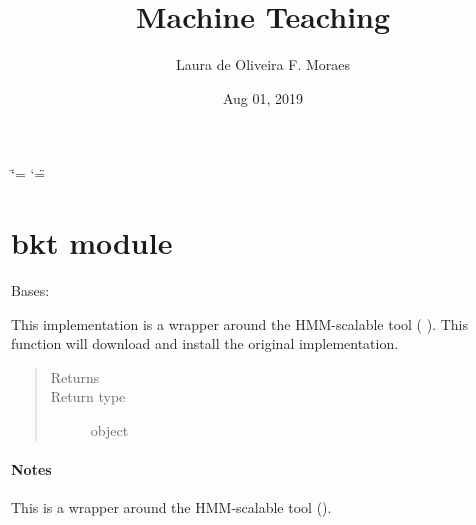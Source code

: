 \documentclass[letterpaper,10pt,english]{sphinxmanual}
\title{Machine Teaching}
\date{Aug 01, 2019}
\author{Laura de Oliveira F.\@{} Moraes}
\begin{document}
\ifdefined\shorthandoff
  \ifnum\catcode`\=\string=\active\shorthandoff{=}\fi
  \ifnum\catcode`\"=\active{}\fi
\fi

\pagestyle{empty}
\sphinxmaketitle
\pagestyle{plain}
\sphinxtableofcontents
\pagestyle{normal}
\label{\detokenize{index::doc}}



\chapter{bkt module}
\label{\detokenize{bkt:module-bkt}}\label{\detokenize{bkt:bkt-module}}\label{\detokenize{bkt::doc}}

\begin{fulllineitems}
\label{\detokenize{bkt:bkt.BKT}}
Bases: 

\begin{fulllineitems}
\label{\detokenize{bkt:bkt.BKT.download}}
This implementation is a wrapper around the
HMM-scalable tool ( ).
This function will download and install the original implementation.
\begin{quote}\begin{description}
\item[{Returns}] \leavevmode
{}

\item[{Return type}] \leavevmode
object

\end{description}\end{quote}
\subsubsection*{Notes}

This is a wrapper around the HMM-scalable tool ().

\end{fulllineitems}


\end{fulllineitems}
\end{document}
